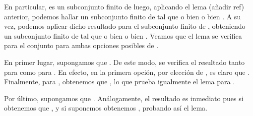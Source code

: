 \begin{isabellebody}
\begin{isamarkuptext}
\begin{demostracion}
  En particular,  es un subconjunto finito de  luego, aplicando el lema (añadir
  ref) anterior, podemos hallar un subconjunto finito  de  tal que o bien 
   o bien . A su vez, podemos aplicar dicho resultado para el subconjunto
  finito  de , obteniendo un subconjunto finito  de  tal que o bien 
   o bien . Veamos que el lema se verifica para el conjunto  para
  ambas opciones posibles de .

  En primer lugar, supongamos que . De este modo, se verifica el resultado tanto para
   como para . En efecto, en la primera opción, por elección de , es claro
  que . Finalmente, para , obtenemos que , lo que prueba
  igualmente el lema para .

  Por último, supongamos que . Análogamente, el resultado es inmediato pues si 
   obtenemos que , y si suponemos  obtenemos , probando
  así el lema.
\end{demostracion}


\end{isamarkuptext}
\end{isabellebody}
